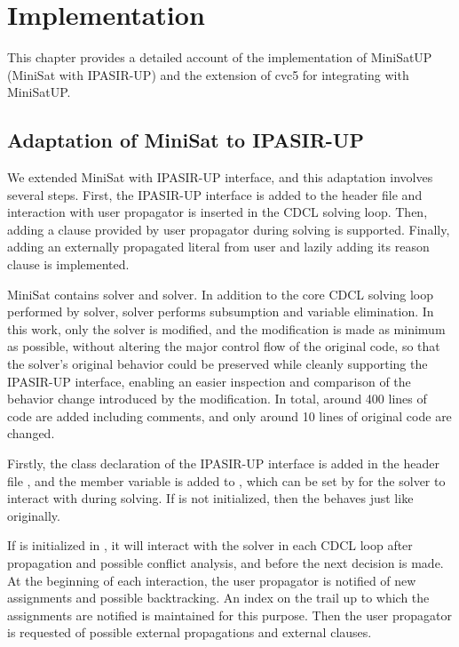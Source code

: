 \chapter{Implementation}

This chapter provides a detailed account of the implementation of MiniSatUP (MiniSat with IPASIR-UP) and the extension of cvc5 for integrating with MiniSatUP.

\section{Adaptation of MiniSat to IPASIR-UP}

We extended MiniSat with IPASIR-UP interface, and this adaptation involves several steps. First, the IPASIR-UP interface is added to the header file and interaction with user propagator is inserted in the CDCL solving loop. Then, adding a clause provided by user propagator during solving is supported. Finally, adding an externally propagated literal from user and lazily adding its reason clause is implemented.

MiniSat contains  solver and  solver. In addition to the core CDCL solving loop performed by  solver,  solver performs subsumption and variable elimination. In this work, only the  solver is modified, and the modification is made as minimum as possible, without altering the major control flow of the original code, so that the solver's original behavior could be preserved while cleanly supporting the IPASIR-UP interface, enabling an easier inspection and comparison of the behavior change introduced by the modification. In total, around 400 lines of code are added including comments, and only around 10 lines of original code are changed.

Firstly, the  class declaration of the IPASIR-UP interface is added in the header file , and the  member variable is added to , which can be set by  for the solver to interact with during solving. If  is not initialized, then the  behaves just like originally.

If  is initialized in , it will interact with the solver in each CDCL loop after propagation and possible conflict analysis, and before the next decision is made. At the beginning of each interaction, the user propagator is notified of new assignments and possible backtracking. An index on the trail up to which the assignments are notified is maintained for this purpose. Then the user propagator is requested of possible external propagations and external clauses.

